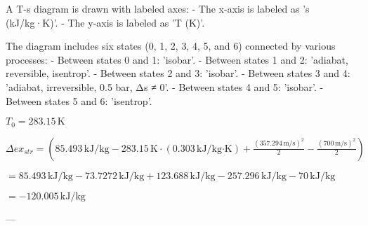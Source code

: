 A T-s diagram is drawn with labeled axes:  
- The x-axis is labeled as 's (kJ/kg·K)'.  
- The y-axis is labeled as 'T (K)'.  

The diagram includes six states (0, 1, 2, 3, 4, 5, and 6) connected by various processes:  
- Between states 0 and 1: 'isobar'.  
- Between states 1 and 2: 'adiabat, reversible, isentrop'.  
- Between states 2 and 3: 'isobar'.  
- Between states 3 and 4: 'adiabat, irreversible, 0.5 bar, Δs ≠ 0'.  
- Between states 4 and 5: 'isobar'.  
- Between states 5 and 6: 'isentrop'.

\( T_0 = 283.15 \, \text{K} \)  

\( \Delta ex_{str} = (85.493 \, \text{kJ/kg} - 283.15 \, \text{K} \cdot (0.303 \, \text{kJ/kg·K}) + \frac{(357.294 \, \text{m/s})^2}{2} - \frac{(700 \, \text{m/s})^2}{2}) \)  

\( = 85.493 \, \text{kJ/kg} - 73.7272 \, \text{kJ/kg} + 123.688 \, \text{kJ/kg} - 257.296 \, \text{kJ/kg} - 70 \, \text{kJ/kg} \)  

\( = -120.005 \, \text{kJ/kg} \)  

---